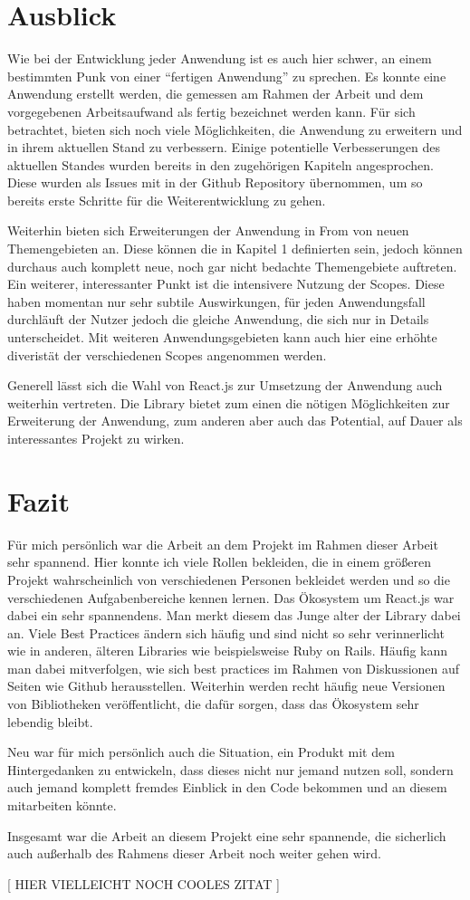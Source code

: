 \section{Ausblick}
Wie bei der Entwicklung jeder Anwendung ist es auch hier schwer, an einem bestimmten Punk von einer “fertigen Anwendung” zu sprechen. Es konnte eine Anwendung erstellt werden, die gemessen am Rahmen der Arbeit und dem vorgegebenen Arbeitsaufwand als fertig bezeichnet werden kann. Für sich betrachtet, bieten sich noch viele Möglichkeiten, die Anwendung zu erweitern und in ihrem aktuellen Stand zu verbessern.
Einige potentielle Verbesserungen des aktuellen Standes wurden bereits in den zugehörigen Kapiteln angesprochen. Diese wurden als Issues mit in der Github Repository übernommen, um so bereits erste Schritte für die Weiterentwicklung zu gehen.

Weiterhin bieten sich Erweiterungen der Anwendung in From von neuen Themengebieten an. Diese können die in Kapitel 1 definierten sein, jedoch können durchaus auch komplett neue, noch gar nicht bedachte Themengebiete auftreten.
Ein weiterer, interessanter Punkt ist die intensivere Nutzung der Scopes. Diese haben momentan nur sehr subtile Auswirkungen, für jeden Anwendungsfall durchläuft der Nutzer jedoch die gleiche Anwendung, die sich nur in Details unterscheidet. Mit weiteren Anwendungsgebieten kann auch hier eine erhöhte diveristät der verschiedenen Scopes angenommen werden.

Generell lässt sich die Wahl von React.js zur Umsetzung der Anwendung auch weiterhin vertreten. Die Library bietet zum einen die nötigen Möglichkeiten zur Erweiterung der Anwendung, zum anderen aber auch das Potential, auf Dauer als interessantes Projekt zu wirken.


\section{Fazit}
Für mich persönlich war die Arbeit an dem Projekt im Rahmen dieser Arbeit sehr spannend. Hier konnte ich viele Rollen bekleiden, die in einem größeren Projekt wahrscheinlich von verschiedenen Personen bekleidet werden und so die verschiedenen Aufgabenbereiche kennen lernen.
Das Ökosystem um React.js war dabei ein sehr spannendens. Man merkt diesem das Junge alter der Library dabei an. Viele Best Practices ändern sich häufig und sind nicht so sehr verinnerlicht wie in anderen, älteren Libraries wie beispielsweise Ruby on Rails. Häufig kann man dabei mitverfolgen, wie sich best practices im Rahmen von Diskussionen auf Seiten wie Github herausstellen. Weiterhin werden recht häufig neue Versionen von Bibliotheken veröffentlicht, die dafür sorgen, dass das Ökosystem sehr lebendig bleibt.

Neu war für mich persönlich auch die Situation, ein Produkt mit dem Hintergedanken zu entwickeln, dass dieses nicht nur jemand nutzen soll, sondern auch jemand komplett fremdes Einblick in den Code bekommen und an diesem mitarbeiten könnte.

Insgesamt war die Arbeit an diesem Projekt eine sehr spannende, die sicherlich auch außerhalb des Rahmens dieser Arbeit noch weiter gehen wird.

[ HIER VIELLEICHT NOCH COOLES ZITAT ]
